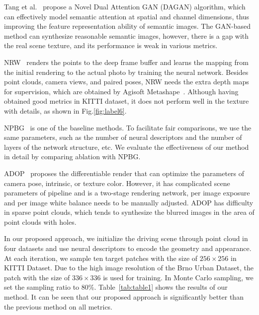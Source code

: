 \documentclass[sigconf]{acmart}
\begin{document}
Tang et al.~\cite{tang2020dual} propose a Novel Dual Attention GAN (DAGAN) algorithm, which can effectively model semantic attention at spatial and channel dimensions, thus improving the feature representation ability of semantic images. The GAN-based method can synthesize reasonable semantic images, however, there is a gap with the real scene texture, and its performance is weak in various metrics.

NRW~\cite{meshry2019neural} renders the points to the deep frame buffer and learns the mapping from the initial rendering to the actual photo by training the neural network. Besides point clouds, camera views, and paired poses, NRW needs the extra depth maps for supervision, which are obtained by Agisoft Metashape~\cite{Metashape}. Although having obtained good metrics in KITTI dataset, it does not perform well in the texture with details, as shown in Fig.\ref{fig:label6}. 




NPBG~\cite{aliev2020neural} is one of the baseline methods. To facilitate fair comparisons, we use the same parameters, such as the number of neural descriptors and the number of layers of the network structure, etc. We evaluate the effectiveness of our method in detail by comparing ablation with NPBG.



ADOP~\cite{ruckert2021adop} proposes the differentiable render that can optimize the parameters of camera pose, intrinsic, or texture color. However, it has complicated scene parameters of pipeline and is a two-stage rendering network, per image exposure and per image white balance needs to be manually adjusted. ADOP has difficulty in sparse point clouds, which tends to synthesize the blurred images in the area of point clouds with holes.

In our proposed approach, we initialize the driving scene through point cloud in four datasets and use neural descriptors to encode the geometry and appearance. At each iteration, we sample ten target patches with the size of $256 \times 256$ in KITTI Dataset. Due to the high image resolution of the Brno Urban Dataset, the patch with the size of $336 \times 336$ is used for training. In Monte Carlo sampling, we set the sampling ratio to 80\%. Table~\ref{tab:table1} shows the results of our method. It can be seen that our proposed approach is significantly better than the previous method on all metrics.
\end{document}

